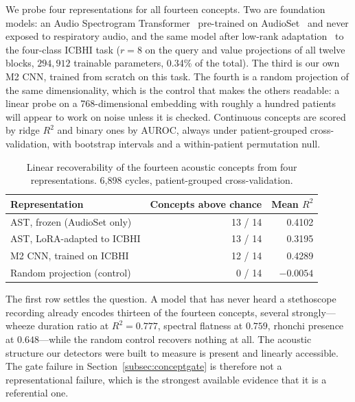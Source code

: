 \documentclass[journal,onecolumn]{IEEEtran}
\begin{document}
We probe four representations for all fourteen concepts. Two are foundation models: an
Audio Spectrogram Transformer~\cite{gong2021ast} pre-trained on
AudioSet~\cite{gemmeke2017audioset} and never exposed to respiratory audio, and the
same model after low-rank adaptation~\cite{hu2022lora} to the four-class ICBHI task
($r=8$ on the query and value projections of all twelve blocks, $294{,}912$ trainable
parameters, 0.34\% of the total). The third is our own M2 CNN, trained from scratch on
this task. The fourth is a random projection of the same dimensionality, which is the
control that makes the others readable: a linear probe on a 768-dimensional embedding
with roughly a hundred patients will appear to work on noise unless it is checked.
Continuous concepts are scored by ridge $R^2$ and binary ones by AUROC, always under
patient-grouped cross-validation, with bootstrap intervals and a within-patient
permutation null.

\begin{table}[!t]
\centering
\caption{Linear recoverability of the fourteen acoustic concepts from four
representations. 6{,}898 cycles, patient-grouped cross-validation.}
\label{tab:probe}
\begin{tabular}{lrr}
\toprule
Representation & Concepts above chance & Mean $R^2$ \\
\midrule
AST, frozen (AudioSet only)      & 13 / 14 & 0.4102 \\
AST, LoRA-adapted to ICBHI       & 13 / 14 & 0.3195 \\
M2 CNN, trained on ICBHI         & 12 / 14 & 0.4289 \\
Random projection (control)      & \phantom{0}0 / 14 & $-0.0054$ \\
\bottomrule
\end{tabular}
\end{table}

The first row settles the question. A model that has never heard a stethoscope
recording already encodes thirteen of the fourteen concepts, several strongly---wheeze
duration ratio at $R^2=0.777$, spectral flatness at $0.759$, rhonchi presence at
$0.648$---while the random control recovers nothing at all. The acoustic structure our
detectors were built to measure is present and linearly accessible. The gate failure in
Section~\ref{subsec:conceptgate} is therefore not a representational failure, which is
the strongest available evidence that it is a referential one.
\end{document}
